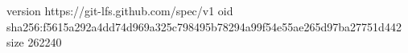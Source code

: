 version https://git-lfs.github.com/spec/v1
oid sha256:f5615a292a4dd74d969a325c798495b78294a99f54e55ae265d97ba27751d442
size 262240
